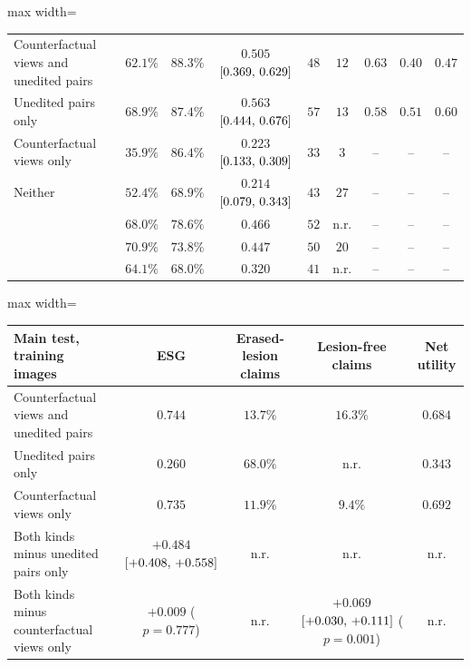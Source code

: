 \begin{table}[!htbp]
\begin{adjustbox}{max width=\linewidth}
\begin{tabular}{l cc c cc ccc}
\midrule
Counterfactual views and unedited pairs & $62.1\%$ & $88.3\%$ & $0.505$ $[0.369,\,0.629]$ & $48$ & $12$ & $0.63$ & $0.40$ & $0.47$ \\
Unedited pairs only & $68.9\%$ & $87.4\%$ & $0.563$ $[0.444,\,0.676]$ & $57$ & $13$ & $0.58$ & $0.51$ & $0.60$ \\
Counterfactual views only & $35.9\%$ & $86.4\%$ & $0.223$ $[0.133,\,0.309]$ & $33$ & $3$ & -- & -- & -- \\
Neither & $52.4\%$ & $68.9\%$ & $0.214$ $[0.079,\,0.343]$ & $43$ & $27$ & -- & -- & -- \\
\midrule
\gem{} & $68.0\%$ & $78.6\%$ & $0.466$ & $52$ & n.r. & -- & -- & -- \\
\opus{} & $70.9\%$ & $73.8\%$ & $0.447$ & $50$ & $20$ & -- & -- & -- \\
\gpt{} & $64.1\%$ & $68.0\%$ & $0.320$ & $41$ & n.r. & -- & -- & -- \\
\bottomrule
\end{tabular}
\end{adjustbox}

\vspace{0.6em}
\begin{adjustbox}{max width=\linewidth}
\begin{tabular}{l cccc}
\toprule
Main test, training images & ESG & Erased-lesion claims & Lesion-free claims & Net utility \\
\midrule
Counterfactual views and unedited pairs & $0.744$ & $13.7\%$ & $16.3\%$ & $0.684$ \\
Unedited pairs only & $0.260$ & $68.0\%$ & n.r. & $0.343$ \\
Counterfactual views only & $0.735$ & $11.9\%$ & $9.4\%$ & $0.692$ \\
\midrule
Both kinds minus unedited pairs only & $+0.484$ $[+0.408,\,+0.558]$ & n.r. & n.r. & n.r. \\
Both kinds minus counterfactual views only & $+0.009$ ($p = 0.777$) & n.r. & $+0.069$ $[+0.030,\,+0.111]$ ($p = 0.001$) & n.r. \\
\bottomrule
\end{tabular}
\end{adjustbox}
\end{table}

